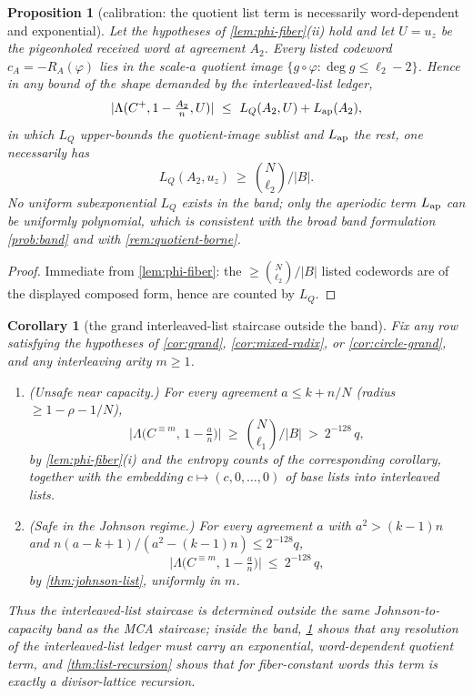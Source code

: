 \documentclass[11pt]{article}
\newtheorem{proposition}[proposition]{Proposition}
\newtheorem{corollary}[corollary]{Corollary}
\theoremstyle{definition}
\theoremstyle{remark}
\newcommand{\B}{B}
\newcommand{\Lst}{\Lambda}
\begin{document}
\begin{proposition}[calibration: the quotient list term is necessarily word-dependent and exponential]\label{prop:list-calibration}
Let the hypotheses of \cref{lem:phi-fiber}\textup{(ii)} hold and let $U=u_z$ be the pigeonholed received word at agreement $A_2$. Every listed codeword $c_A=-R_A(\varphi)$ lies in the scale-$a$ quotient image $\{g\circ\varphi:\deg g\le\ell_2-2\}$. Hence in any bound of the shape demanded by the interleaved-list ledger,
\[
|\Lst(C^+,1-\tfrac{A_2}n,U)|\ \le\ L_Q(A_2,U)+L_{\rm ap}(A_2),
\]
in which $L_Q$ upper-bounds the quotient-image sublist and $L_{\rm ap}$ the rest, one necessarily has
\[
L_Q(A_2,u_z)\ \ge\ \binom N{\ell_2}\Big/|\B| .
\]
No uniform subexponential $L_Q$ exists in the band; only the aperiodic term $L_{\rm ap}$ can be uniformly polynomial, which is consistent with the broad band formulation \cref{prob:band} and with \cref{rem:quotient-borne}.
\end{proposition}

\begin{proof}
Immediate from \cref{lem:phi-fiber}: the $\ge\binom N{\ell_2}/|\B|$ listed codewords are of the displayed composed form, hence are counted by $L_Q$.
\end{proof}

\begin{corollary}[the grand interleaved-list staircase outside the band]\label{cor:list-sandwich}
Fix any row satisfying the hypotheses of \cref{cor:grand}, \cref{cor:mixed-radix}, or \cref{cor:circle-grand}, and any interleaving arity $m\ge1$.
\begin{enumerate}[label=\textup{(\roman*)}]
\item \textup{(Unsafe near capacity.)} For every agreement $a\le k+n/N$ \textup(radius $\ge1-\rho-1/N$\textup),
\[
\bigl|\Lst\bigl(C^{\equiv m},\,1-\tfrac an\bigr)\bigr|\ \ge\ \binom N{\ell_1}\Big/|\B|\ >\ 2^{-128}\,q ,
\]
by \cref{lem:phi-fiber}\textup{(i)} and the entropy counts of the corresponding corollary, together with the embedding $c\mapsto(c,0,\dots,0)$ of base lists into interleaved lists.
\item \textup{(Safe in the Johnson regime.)} For every agreement $a$ with $a^2>(k-1)n$ and $n(a-k+1)/(a^2-(k-1)n)\le2^{-128}q$,
\[
\bigl|\Lst\bigl(C^{\equiv m},\,1-\tfrac an\bigr)\bigr|\ \le\ 2^{-128}\,q ,
\]
by \cref{thm:johnson-list}, uniformly in $m$.
\end{enumerate}
Thus the interleaved-list staircase is determined outside the same Johnson-to-capacity band as the MCA staircase; inside the band, \cref{prop:list-calibration} shows that any resolution of the interleaved-list ledger must carry an exponential, word-dependent quotient term, and \cref{thm:list-recursion} shows that for fiber-constant words this term is exactly a divisor-lattice recursion.
\end{corollary}
\end{document}
